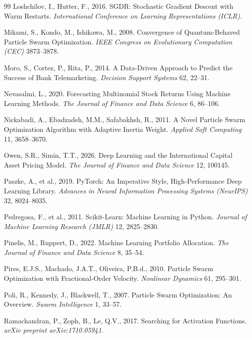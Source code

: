 \begin{thebibliography}{99}
Loshchilov, I., Hutter, F., 2016. SGDR: Stochastic Gradient Descent with Warm Restarts. \textit{International Conference on Learning Representations (ICLR)}.

Mikami, S., Kondo, M., Ishikawa, M., 2008. Convergence of Quantum-Behaved Particle Swarm Optimization. \textit{IEEE Congress on Evolutionary Computation (CEC)} 3873–3878.

Moro, S., Cortez, P., Rita, P., 2014. A Data-Driven Approach to Predict the Success of Bank Telemarketing. \textit{Decision Support Systems} 62, 22–31.

Nevasalmi, L., 2020. Forecasting Multinomial Stock Returns Using Machine Learning Methods. \textit{The Journal of Finance and Data Science} 6, 86–106.

Nickabadi, A., Ebadzadeh, M.M., Safabakhsh, R., 2011. A Novel Particle Swarm Optimization Algorithm with Adaptive Inertia Weight. \textit{Applied Soft Computing} 11, 3658–3670.

Owen, S.R., Simin, T.T., 2026. Deep Learning and the International Capital Asset Pricing Model. \textit{The Journal of Finance and Data Science} 12, 100145.

Paszke, A., et al., 2019. PyTorch: An Imperative Style, High-Performance Deep Learning Library. \textit{Advances in Neural Information Processing Systems (NeurIPS)} 32, 8024–8035.

Pedregosa, F., et al., 2011. Scikit-Learn: Machine Learning in Python. \textit{Journal of Machine Learning Research (JMLR)} 12, 2825–2830.

Pinelis, M., Ruppert, D., 2022. Machine Learning Portfolio Allocation. \textit{The Journal of Finance and Data Science} 8, 35–54.

Pires, E.J.S., Machado, J.A.T., Oliveira, P.B.d., 2010. Particle Swarm Optimization with Fractional-Order Velocity. \textit{Nonlinear Dynamics} 61, 295–301.

Poli, R., Kennedy, J., Blackwell, T., 2007. Particle Swarm Optimization: An Overview. \textit{Swarm Intelligence} 1, 33–57.

Ramachandran, P., Zoph, B., Le, Q.V., 2017. Searching for Activation Functions. \textit{arXiv preprint arXiv:1710.05941}.


\end{thebibliography}
